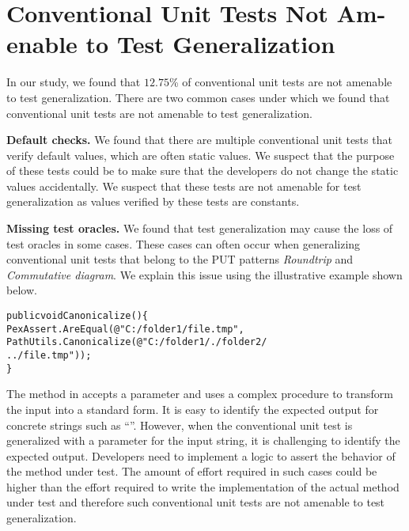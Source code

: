 \section{Conventional Unit Tests Not Am- enable to Test Generalization} 
\label{sec:notamenable}

In our study, we found that $12.75$\% of conventional unit tests are not amenable to test generalization. There are two common cases under which we found that conventional unit tests are not amenable to test generalization. 

\textbf{Default checks.} We found that there are multiple conventional unit
tests that verify default values, which are often static values. We suspect
that the purpose of these tests could be to make sure that the developers do not
change the static values accidentally. We suspect that these tests are
not amenable for test generalization as values verified by these tests
are constants.

\textbf{Missing test oracles.} We found that test generalization
may cause the loss of test oracles in some cases. These cases can often occur when generalizing conventional unit tests that belong to the PUT patterns \emph{Roundtrip} and \emph{Commutative diagram}.
We explain this issue using the illustrative example shown below.

\begin{CodeOut}
\begin{alltt}
public void Canonicalize() \{
\hspace*{0.1in}PexAssert.AreEqual(@"C:/folder1/file.tmp",
\hspace*{0.3in}PathUtils.Canonicalize(@"C:/folder1/./folder2/
\hspace*{0.3in}../file.tmp")); 
\}
\end{alltt}
\end{CodeOut}
 
The  method in  accepts
a  parameter and uses a complex procedure to transform the input  into a standard form. It is easy to identify the expected output for concrete strings
such as ``''. However, when the
conventional unit test is generalized with a parameter for the input string, it is challenging to 
identify the expected output. Developers need to implement a logic to assert the behavior of the method under test. The amount of effort required in such cases could be higher than the effort required to write the implementation of the actual method under test and therefore such conventional unit tests are not amenable to test generalization.
